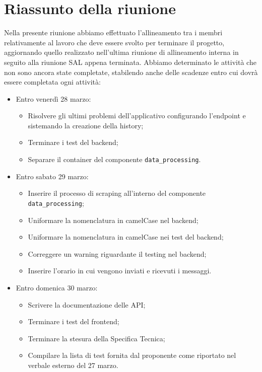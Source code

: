 \section{Riassunto della riunione}
Nella presente riunione abbiamo effettuato l'allineamento tra i membri relativamente al lavoro che deve essere svolto per terminare il progetto, aggiornando quello realizzato nell'ultima riunione di allineamento interna in seguito alla riunione SAL appena terminata.
Abbiamo determinato le attività che non sono ancora state completate, stabilendo anche delle scadenze entro cui dovrà essere completata ogni attività:
\begin{itemize}
    \item Entro venerdì 28 marzo:
    \begin{itemize}
        \item Risolvere gli ultimi problemi dell'applicativo configurando l'endpoint e sistemando la creazione della history;
        \item Terminare i test del backend;
        \item Separare il container del componente \texttt{data\_processing}.
    \end{itemize}
    \item Entro sabato 29 marzo:
    \begin{itemize}
        \item Inserire il processo di scraping all'interno del componente \texttt{data\_processing};
        \item Uniformare la nomenclatura in camelCase nel backend;
        \item Uniformare la nomenclatura in camelCase nei test del backend;
        \item Correggere un warning riguardante il testing nel backend;
        \item Inserire l'orario in cui vengono inviati e ricevuti i messaggi.
    \end{itemize}
    \item Entro domenica 30 marzo:
    \begin{itemize}
        \item Scrivere la documentazione delle API;
        \item Terminare i test del frontend;
        \item Terminare la stesura della Specifica Tecnica;
        \item Compilare la lista di test fornita dal proponente come riportato nel verbale esterno del 27 marzo.
    \end{itemize}

\end{itemize}
